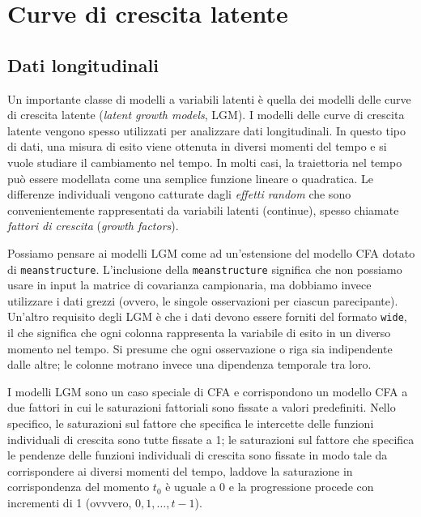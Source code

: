 \documentclass[
  11pt,
]{krantz}
\theoremstyle{definition}
\theoremstyle{definition}
\theoremstyle{definition}
\theoremstyle{definition}
\theoremstyle{remark}
\begin{document}
\hypertarget{ch:growth_models}{%
\chapter{Curve di crescita latente}\label{ch:growth_models}}

\hypertarget{dati-longitudinali}{%
\section{Dati longitudinali}\label{dati-longitudinali}}

Un importante classe di modelli a variabili latenti è quella dei modelli delle curve di crescita latente (\emph{latent growth models}, LGM). I modelli delle curve di crescita latente vengono spesso utilizzati per analizzare dati longitudinali. In questo tipo di dati, una misura di esito viene ottenuta in diversi momenti del tempo e si vuole studiare il cambiamento nel tempo. In molti casi, la traiettoria nel tempo può essere modellata come una semplice funzione lineare o quadratica. Le differenze individuali vengono catturate dagli \emph{effetti random} che sono convenientemente rappresentati da variabili latenti (continue), spesso chiamate \emph{fattori di crescita} (\emph{growth factors}).

Possiamo pensare ai modelli LGM come ad un'estensione del modello CFA dotato di \texttt{meanstructure}. L'inclusione della \texttt{meanstructure} significa che non possiamo usare in input la matrice di covarianza campionaria, ma dobbiamo invece utilizzare i dati grezzi (ovvero, le singole osservazioni per ciascun parecipante). Un'altro requisito degli LGM è che i dati devono essere forniti del formato \texttt{wide}, il che significa che ogni colonna rappresenta la variabile di esito in un diverso momento nel tempo. Si presume che ogni osservazione o riga sia indipendente dalle altre; le colonne motrano invece una dipendenza temporale tra loro.

I modelli LGM sono un caso speciale di CFA e corrispondono un modello CFA a due fattori in cui le saturazioni fattoriali sono fissate a valori predefiniti. Nello specifico, le saturazioni sul fattore che specifica le intercette delle funzioni individuali di crescita sono tutte fissate a 1; le saturazioni sul fattore che specifica le pendenze delle funzioni individuali di crescita sono fissate in modo tale da corrispondere ai diversi momenti del tempo, laddove la saturazione in corrispondenza del momento \(t_0\) è uguale a 0 e la progressione procede con incrementi di 1 (ovvvero, \(0, 1, \dots, t-1\)).
\end{document}
